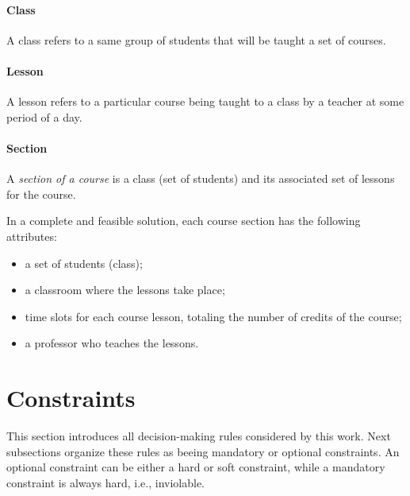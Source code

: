 \paragraph{Class}
\label{defclass}

A class refers to a same group of students that will be taught a set of courses.


\paragraph{Lesson}
\label{deflesson}

A lesson refers to a particular course being taught to a class by a teacher at some period of a day.


\paragraph{Section}
\label{defsection}

A \textit{section of a course} is a class (set of students) and its associated set of lessons for the course.

In a complete and feasible solution, each course section has the following attributes:
\begin{itemize}
\item a set of students (class);
\item a classroom where the lessons take place;
\item time slots for each course lesson, totaling the number of credits of the course;
\item a professor who teaches the lessons.
\end{itemize}





\pagebreak

\section{Constraints}
\label{sec:allconstr}

This section introduces all decision-making rules considered by this work. Next subsections organize these rules as beeing mandatory or optional constraints. An optional constraint can be either a hard or soft constraint, while a mandatory constraint is always hard, i.e., inviolable.


